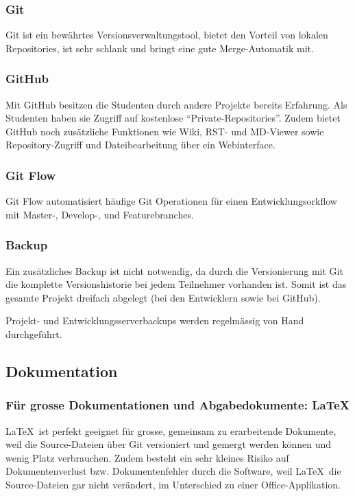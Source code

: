 			\subsubsection{Git}
				Git ist ein bewährtes Versionsverwaltungstool, bietet den Vorteil von lokalen Repositories, ist sehr schlank und bringt eine gute Merge-Automatik mit.

			\subsubsection{GitHub}
				Mit GitHub besitzen die Studenten durch andere Projekte bereits Erfahrung. Als
				Studenten haben sie Zugriff auf kostenlose "`Private-Repositories"'. Zudem
				bietet GitHub noch zusätzliche Funktionen wie Wiki, RST- und MD-Viewer sowie
				Repository-Zugriff und Dateibearbeitung über ein Webinterface.
				
			\subsubsection{Git Flow}
				Git Flow automatisiert häufige Git Operationen für einen Entwicklungsorkflow mit Master-, Develop-, und Featurebranches.

			\subsubsection{Backup}
				Ein zusätzliches Backup ist nicht notwendig, da durch die Versionierung mit Git die komplette Versionshistorie bei jedem Teilnehmer vorhanden ist. Somit ist das gesamte Projekt dreifach abgelegt (bei den Entwicklern sowie bei GitHub).
				
				Projekt- und Entwicklungsserverbackups werden regelmässig von Hand durchgeführt.


		\subsection{Dokumentation}
			\subsubsection{Für grosse Dokumentationen und Abgabedokumente: \LaTeX}
				\LaTeX\ ist perfekt geeignet für grosse, gemeinsam zu erarbeitende Dokumente,
				weil die Source-Dateien über Git versioniert und gemergt werden können und wenig
				Platz verbrauchen. 
				Zudem besteht ein sehr kleines Risiko auf Dokumentenverlust
				bzw. Dokumentenfehler durch die Software, weil \LaTeX\ die Source-Dateien gar
				nicht verändert, im Unterschied zu einer Office-Applikation.
				
